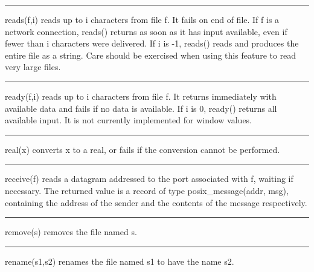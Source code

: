 \bigskip\hrule\vspace{0.1cm}

\noindent
{}\textsf{reads(f,i)} reads up to \textsf{i} characters
from file \textsf{f}. It fails on end of file. If \textsf{f} is a
network connection, \textsf{reads()} returns as soon as it has input
available, even if fewer than \textsf{i} characters were delivered. If
\textsf{i} is -1, \textsf{reads()} reads and produces the entire file
as a string. Care should be exercised when using this feature to read
very large files.

\bigskip\hrule\vspace{0.1cm}

\noindent
{}\textsf{ready(f,i)} reads up to \textsf{i} characters
from file \textsf{f}. It returns immediately with available data and
fails if no data is available. If \textsf{i} is 0, \textsf{ready()}
returns all available input. It is not currently implemented for window
values.

\bigskip\hrule\vspace{0.1cm}

\noindent
{}\textsf{real(x)} converts \textsf{x} to a real,
or fails if the conversion cannot be performed.

\bigskip\hrule\vspace{0.1cm}

\noindent
{}\textsf{receive(f)} reads a datagram addressed
to the port associated with \textsf{f}, waiting if necessary. The
returned value is a record of type \textsf{posix\_message(addr, msg)},
containing the address of the sender and the contents of the message
respectively. 

\bigskip\hrule\vspace{0.1cm}

\noindent
{}\textsf{remove(s)} removes the
file named \textsf{s}.

\bigskip\hrule\vspace{0.1cm}

\noindent
{}\textsf{rename(s1,s2)} renames the file named
\textsf{s1} to have the name \textsf{s2}.

